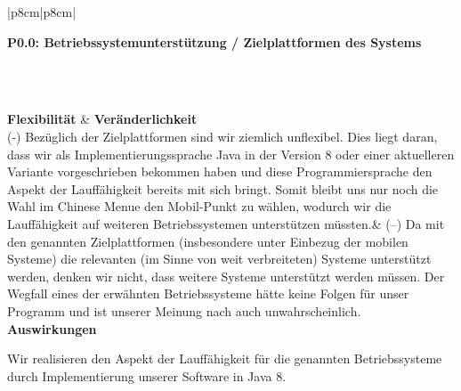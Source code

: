 \documentclass[enabledeprecatedfontcommands,fontsize=11pt,paper=a4,twoside]{scrartcl}
\newcounter{one}
\newcounter{two}[one]
\newcommand{\tone}{0\theone}
\newcommand{\two}{\stepcounter{two}0\thetwo}
\newcommand\s{\rule{0pt}{4ex}}
\begin{document}
\begin{tabular} {|p{8cm}|p{8cm}|}
	\hline
	 {\parbox{16cm}{\textbf{\hypertarget{f}{P\tone.\two}: Betriebssystemunterstützung / Zielplattformen des Systems} }}\\ \hline \hline
	\s\\ [1ex] \hline
	\textbf{Flexibilität}  & \textbf{Veränderlichkeit} \\ 
	(-) Bezüglich der Zielplattformen sind wir ziemlich unflexibel. Dies liegt daran, dass wir als Implementierungssprache Java in der Version 8 oder einer aktuelleren Variante vorgeschrieben bekommen haben und diese Programmiersprache den Aspekt der Lauffähigkeit bereits mit sich bringt. Somit bleibt uns nur noch die Wahl im Chinese Menue den Mobil-Punkt zu wählen, wodurch wir die Lauffähigkeit auf weiteren Betriebssystemen unterstützen müssten.&
	(--) Da mit den genannten Zielplattformen (insbesondere unter Einbezug der mobilen Systeme) die relevanten (im Sinne von weit verbreiteten) Systeme unterstützt werden, denken wir nicht, dass weitere Systeme unterstützt werden müssen. Der Wegfall eines der erwähnten Betriebssysteme hätte keine Folgen für unser Programm und ist unserer Meinung nach auch unwahrscheinlich. \\ \hline
	 {\textbf{Auswirkungen}} \\
	 {\parbox{16cm}{Wir realisieren den Aspekt der Lauffähigkeit für die genannten Betriebssysteme durch Implementierung unserer Software in Java 8.} }\\[2ex] \hline
\end{tabular}
\\ \\ \\ \\ %
\end{document}
